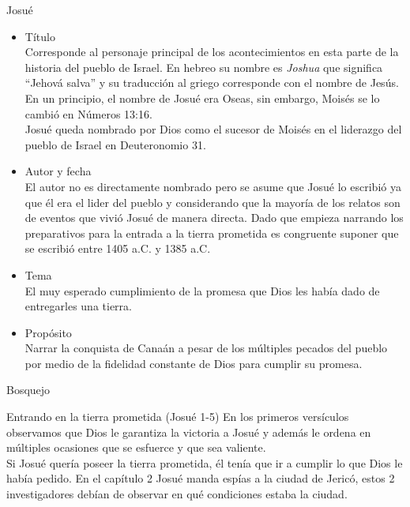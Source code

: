 

%
\begin{section}{Josué}
	\begin{itemize}
		\item Título\\
			Corresponde al personaje principal de los acontecimientos en esta parte de la historia del pueblo de Israel. En hebreo su nombre es \textit{Joshua} que significa ``Jehová salva'' y su traducción al griego corresponde con el nombre de Jesús.
			En un principio, el nombre de Josué era Oseas, sin embargo, Moisés se lo cambió en Números 13:16.\\
			Josué queda nombrado por Dios como el sucesor de Moisés en el liderazgo del pueblo de Israel en Deuteronomio 31.
		\item Autor y fecha\\
El autor no es directamente nombrado pero se asume que Josué lo escribió ya que él era el lider del pueblo y considerando que la mayoría de los relatos son de eventos que vivió Josué de manera directa.
Dado que empieza narrando los preparativos para la entrada a la tierra prometida es congruente suponer que se escribió entre 1405 a.C. y 1385 a.C. 
		\item Tema\\
El muy esperado cumplimiento de la promesa que Dios les había dado de entregarles una tierra.
		\item Propósito\\
			Narrar la conquista de Canaán a pesar de los múltiples pecados del pueblo por medio de la fidelidad constante de Dios para cumplir su promesa.
	\end{itemize}
	\begin{subsection}{Bosquejo}
		\begin{subsubsection}{Entrando en la tierra prometida (Josué 1-5)}
				En los primeros versículos observamos que Dios le garantiza la victoria a Josué y además le ordena en múltiples ocasiones que se esfuerce y que sea valiente.\\
Si Josué quería poseer la tierra prometida, él tenía que ir a cumplir lo que Dios le había pedido. 
En el capítulo 2 Josué manda espías a la ciudad de Jericó, estos 2 investigadores debían de observar en qué condiciones estaba la ciudad.\\\\

\end{subsubsection}
\end{subsection}
\end{section}
